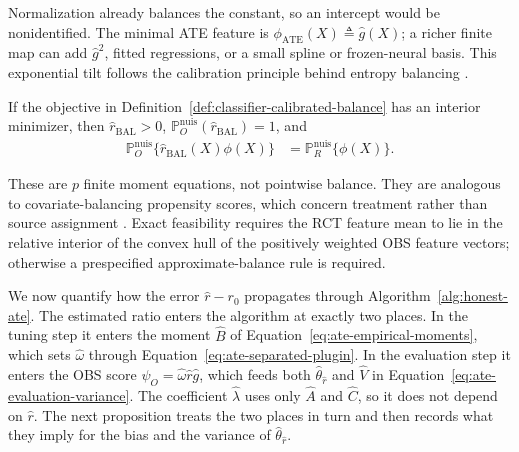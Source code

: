 Normalization already balances the constant, so an intercept would be
nonidentified. The minimal ATE feature is
$\phi_{\mathrm{ATE}}(X)\triangleq\widehat{g}(X)$; a richer finite map can add
$\widehat{g}^2$, fitted regressions, or a small spline or frozen-neural basis.
This exponential tilt follows the calibration principle behind entropy
balancing \citep{hainmueller2012entropy}.

\begin{proposition}
\label{prop:automatic-ratio-balance}
If the objective in Definition~\ref{def:classifier-calibrated-balance} has an
interior minimizer, then $\widehat r_{\mathrm{BAL}}>0$,
$\mathbb P_O^{\mathrm{nuis}}(\widehat r_{\mathrm{BAL}})=1$, and
\begin{align}
\mathbb P_O^{\mathrm{nuis}}
\{\widehat r_{\mathrm{BAL}}(X)\phi(X)\}
&=\mathbb P_R^{\mathrm{nuis}}\{\phi(X)\}.
\label{eq:ratio-calibration-balance}
\end{align}
\end{proposition}

These are $p$ finite moment equations, not pointwise balance. They are analogous to covariate-balancing propensity scores, which concern treatment rather than source assignment \citep{imai2014covariate}. Exact feasibility requires the RCT feature mean to lie in the relative interior of the convex hull of the positively weighted OBS feature vectors; otherwise a prespecified approximate-balance rule is required.


We now quantify how the error $\widehat r-r_0$ propagates through Algorithm~\ref{alg:honest-ate}. The estimated ratio enters the algorithm at exactly two places. In the tuning step it enters the moment $\widehat B$ of Equation~\eqref{eq:ate-empirical-moments}, which sets $\widehat\omega$ through Equation~\eqref{eq:ate-separated-plugin}. In the evaluation step it enters the OBS score $\psi_O=\widehat\omega\widehat r\widehat g$, which feeds both $\widehat\theta_{\widehat r}$ and $\widehat V$ in Equation~\eqref{eq:ate-evaluation-variance}. The coefficient $\widehat\lambda$ uses only $\widehat A$ and $\widehat C$, so it does not depend on $\widehat r$. The next proposition treats the two places in turn and then records what they imply for the bias and the variance of $\widehat\theta_{\widehat r}$.

